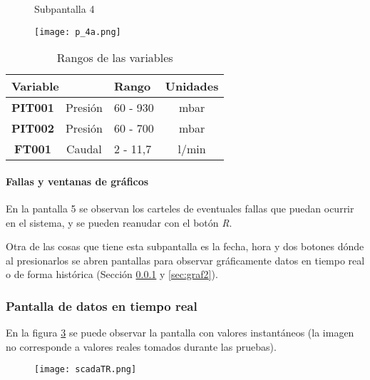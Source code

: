 \begin{figure}[htbp]
	\centering
	\caption{Subpantalla 4} \label{fig:localremoto}
\end{figure}

\begin{figure}[h!]
	\centering
	\texttt{[image: p\_4a.png]}
	\label{fig:LC}
\end{figure}
\begin{table}[]
	\centering
	
	\begin{tabular}{|cc|l|c|}
		\hline
		\multicolumn{2}{|l|}{\textbf{Variable}} & \textbf{Rango} & \multicolumn{1}{l|}{\textbf{Unidades}} \\ \hline
		\multicolumn{1}{|c|}{\textbf{PIT001}} & Presión & 60 - 930 & mbar \\ \hline
		\multicolumn{1}{|c|}{\textbf{PIT002}} & Presión & 60 - 700 & mbar \\ \hline
		\multicolumn{1}{|c|}{\textbf{FT001}} & Caudal & 2 - 11,7 & l/min \\ \hline
	\end{tabular}
\caption{Rangos de las variables}
\label{tab:rang}
\end{table}

\paragraph{Fallas y ventanas de gráficos}
En la pantalla 5 se observan los carteles de eventuales fallas que puedan ocurrir en el sistema, y se pueden reanudar con el botón \textit{R}.

Otra de las cosas que tiene esta subpantalla es la fecha, hora y dos botones dónde al presionarlos se abren pantallas para observar gráficamente datos en tiempo real o de forma histórica (Sección \ref{sec:graf} y \ref{sec:graf2}).

\subsubsection{Pantalla de datos en tiempo real} \label{sec:graf}
En la figura \ref{fig:scadaTR} se puede observar la pantalla con valores instantáneos (la imagen no corresponde a valores reales tomados durante las pruebas).
\begin{figure}[h!]
	\centering
	\texttt{[image: scadaTR.png]}
	\label{fig:scadaTR}
\end{figure}

